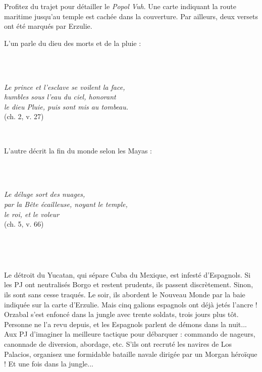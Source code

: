 \documentclass[11pt,twoside,a4paper]{book}
\begin{document}
Profitez du trajet pour d{\'e}tailler le \emph{Popol Vuh}. Une carte indiquant la route maritime jusqu'au temple est cach{\'e}e dans la couverture. Par ailleurs, deux versets ont {\'e}t{\'e} marqu{\'e}s par Erzulie. ~\\

\begin{minipage}[ht]{0.45\textwidth}
	L'un parle du dieu des morts et de la pluie :~\\~\\
	\begin{minipage}[ht]{0.15\textwidth} 
		~\\
	\end{minipage} \hfill \begin{minipage}[ht]{0.80\textwidth} 
		\emph{Le prince et l'esclave se voilent la face, }~\\
		\emph{humbles sous l'eau du ciel, honorant}~\\
		\emph{le dieu Pluie, puis sont mis au tombeau. }~\\
		(ch. 2, v. 27)
	\end{minipage}~\\
\end{minipage} \hfill \begin{minipage}[ht]{0.45\textwidth}
	L'autre d{\'e}crit la fin du monde selon les Mayas :~\\~\\
	\begin{minipage}[ht]{0.15\textwidth} 
		~\\
	\end{minipage} \hfill \begin{minipage}[ht]{0.80\textwidth} 
		\emph{Le d{\'e}luge sort des nuages, }~\\
		\emph{par la B{\^e}te {\'e}cailleuse, noyant le temple,}~\\
		\emph{le roi, et le voleur}~\\
		(ch. 5, v. 66)
	\end{minipage}~\\
\end{minipage}~\\

\clearpage

Le d{\'e}troit du Yucatan, qui s{\'e}pare Cuba du Mexique, est infest{\'e} d'Espagnols. Si les PJ ont neutralis{\'e}s Borgo et restent prudents, ils passent discr{\`e}tement. Sinon, ils sont sans cesse traqu{\'e}s. Le soir, ils abordent le Nouveau Monde par la baie indiqu{\'e}e sur la carte d'Erzulie. Mais cinq galions espagnols ont d{\'e}j{\`a} jet{\'e}s l'ancre ! Orzabal s'est enfonc{\'e} dans la jungle avec trente soldats, trois jours plus t{\^o}t. Personne ne l'a revu depuis, et les Espagnols parlent de d{\'e}mons dans la nuit... Aux PJ d'imaginer la meilleure tactique pour d{\'e}barquer : commando de nageurs, canonnade de diversion, abordage, etc. S'ils ont recrut{\'e} les navires de Los Palacios, organisez une formidable bataille navale dirig{\'e}e par un Morgan h{\'e}ro{\"i}que ! Et une fois dans la jungle...~\\
\end{document}
